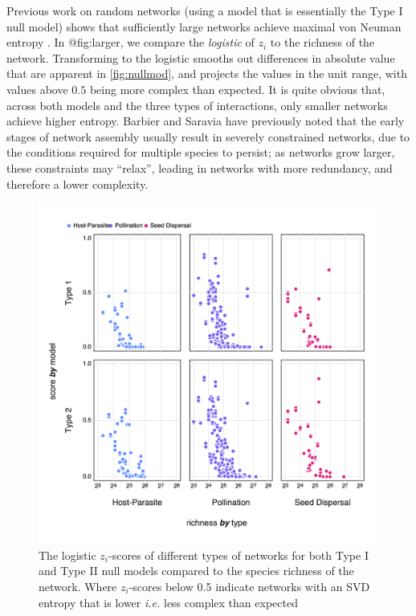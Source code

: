Previous work on random networks (using a model that is essentially the Type I
null model) shows that sufficiently large networks achieve maximal von Neuman
entropy \cite{Du2010NotNeu, Passerini2011NeuEnt}. In @fig:larger, we compare the
\emph{logistic} of \(z_i\) to the richness of the network. Transforming to the
logistic smooths out differences in absolute value that are apparent in
\autoref{fig:nullmod}, and projects the values in the unit range, with values
above \(0.5\) being more complex than expected. It is quite obvious that, across
both models and the three types of interactions, only smaller networks achieve
higher entropy. Barbier\cite{Barbier2018GenAss} and
Saravia\cite{Saravia2018EcoNet} have previously noted that the early stages of
network assembly usually result in severely constrained networks, due to the
conditions required for multiple species to persist; as networks grow larger,
these constraints may ``relax'', leading in networks with more redundancy, and
therefore a lower complexity.

\begin{figure}[h]
    \centering
    \includegraphics[width=\textwidth]{figures/nullmodel_richness.png}
    \caption{The logistic \(z_i\)-scores of different types of networks for both
Type I and Type II null models compared to the species richness of the network.
Where \(z_i\)-scores below 0.5 indicate networks with an SVD entropy that is
lower \emph{i.e.} less complex than expected}
    \label{fig:larger}
\end{figure}

